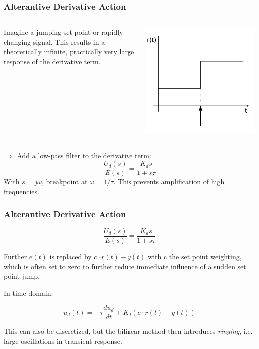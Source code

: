 \begin{frame}
	\frametitle{Alterantive Derivative Action}
		\begin{columns}
			\begin{column}{0.7\linewidth}
				Imagine a jumping set point or rapidly changing signal. 
				This results in a theoretically infinite, practically very large response of
				the derivative term.  
			\end{column}
			\begin{column}{0.3\linewidth}
				\includegraphics[width=\linewidth]{img/piecewise-setpoint}
			\end{column}
		\end{columns}
		\pause
		$\Rightarrow$ Add a low-pass filter to the derivative term:
		\begin{equation*}
			\frac{U_d(s)}{E(s)} = \frac{K_d s}{1+s\tau}
		\end{equation*}
		With $s=j\omega$, breakpoint at $\omega=1/\tau$. This prevents amplification of high frequencies. 
		
		
		
		
\end{frame}

\begin{frame}
	\frametitle{Alterantive Derivative Action}
	\begin{equation*}
		\frac{U_d(s)}{E(s)} = \frac{K_d s}{1+s\tau}
	\end{equation*}
	
	Further $e(t)$ is replaced by $c\cdot r(t)-y(t)$ with c the set point weighting, which is often set to zero to further reduce immediate influence of a sudden set point jump. 
	
	In time domain:
	
	\begin{equation*}
		u_d(t) = -\tau\frac{du_d}{dt} + K_d(c\cdot r(t)-y(t))
	\end{equation*}
	
	This can also be discretized, but the bilinear method then introduces \emph{ringing}, i.e. large oscillations in transient response.
\end{frame}
